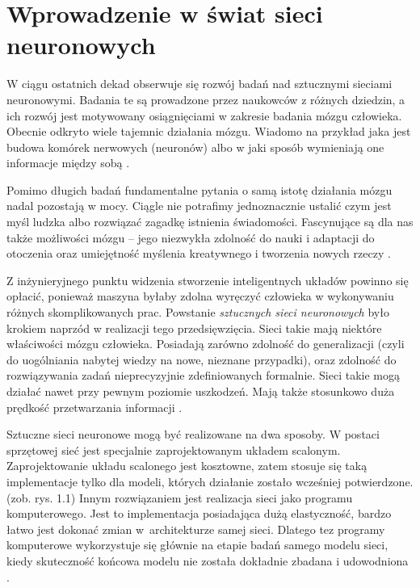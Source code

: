 \chapter{Wprowadzenie w świat sieci neuronowych}

W ciągu ostatnich dekad obserwuje się rozwój badań nad sztucznymi sieciami neuronowymi. Badania te są prowadzone przez naukowców z różnych dziedzin, a ich rozwój jest motywowany osiągnięciami w zakresie badania mózgu człowieka. Obecnie odkryto wiele tajemnic działania mózgu. Wiadomo na przykład jaka jest budowa komórek nerwowych (neuronów) albo w jaki sposób wymieniają one informacje między sobą \citep[s. 13]{Kosinski2017}.

Pomimo długich badań fundamentalne pytania o samą istotę działania mózgu nadal pozostają w mocy. Ciągle nie potrafimy jednoznacznie ustalić czym jest myśl ludzka albo rozwiązać  zagadkę istnienia świadomości. Fascynujące są dla nas także możliwości mózgu -- jego niezwykła zdolność do nauki i adaptacji do otoczenia oraz umiejętność myślenia kreatywnego i tworzenia nowych rzeczy \citep[s. 14]{Kosinski2017}.

Z inżynieryjnego punktu widzenia stworzenie inteligentnych układów powinno się opłacić, ponieważ maszyna byłaby zdolna wyręczyć człowieka w wykonywaniu różnych skomplikowanych prac. Powstanie \textit{sztucznych sieci neuronowych} było krokiem naprzód w realizacji tego przedsięwzięcia. Sieci takie mają niektóre właściwości mózgu człowieka. Posiadają zarówno zdolność do generalizacji (czyli do uogólniania nabytej wiedzy na nowe, nieznane przypadki), oraz zdolność do rozwiązywania zadań nieprecyzyjnie zdefiniowanych formalnie. Sieci takie mogą działać nawet przy pewnym poziomie uszkodzeń. Mają także stosunkowo duża prędkość przetwarzania informacji \citep[s. 15-16]{Kosinski2017}.

Sztuczne sieci neuronowe mogą być realizowane na dwa sposoby. W postaci sprzętowej sieć jest specjalnie zaprojektowanym układem scalonym. Zaprojektowanie układu scalonego jest kosztowne, zatem stosuje się taką implementacje tylko dla modeli, których działanie zostało wcześniej potwierdzone. (zob. rys. 1.1) Innym rozwiązaniem jest realizacja sieci jako programu komputerowego. Jest to implementacja posiadająca dużą elastyczność, bardzo łatwo jest dokonać zmian w~architekturze samej sieci. Dlatego tez programy komputerowe wykorzystuje się głównie na etapie badań samego modelu sieci, kiedy skuteczność końcowa modelu nie została dokładnie zbadana i udowodniona \citep[s. 15]{Kosinski2017}.

